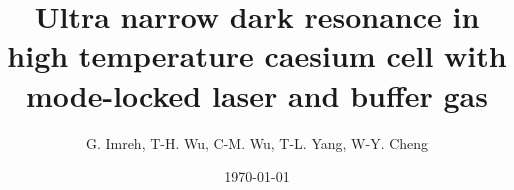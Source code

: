 \documentclass[final,hyperref={pdfpagelabels=false}]{beamer}
\title{\huge Ultra narrow dark resonance in high temperature caesium cell with mode-locked laser and buffer gas}
\author{G. Imreh, T-H. Wu, C-M. Wu, T-L. Yang, W-Y. Cheng}
\institute[IAMS, Academia Sinica]{Institute of Atomic and Molecular Sciences, Academia Sinica, Taiwan}
\date{\today}
\begin{document}
\begin{frame}

\end{frame}
\end{document}
